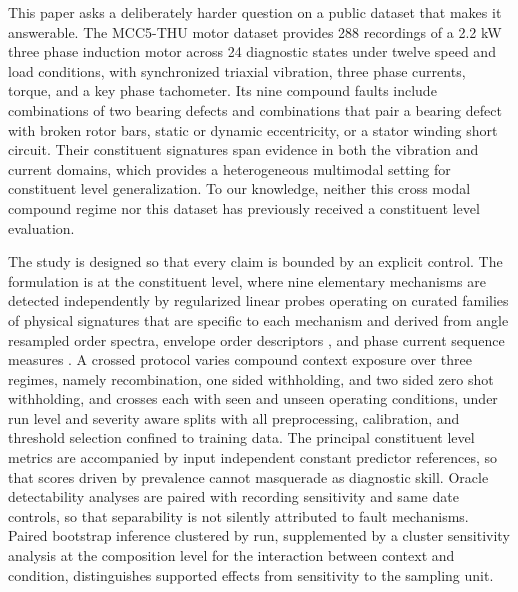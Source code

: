 \documentclass{ieeeaccess}
\begin{document}
This paper asks a deliberately harder question on a public dataset that makes
it answerable. The MCC5-THU motor dataset \cite{chen2026} provides 288
recordings of a 2.2 kW three phase induction motor across 24 diagnostic
states under twelve speed and load conditions, with synchronized triaxial
vibration, three phase currents, torque, and a key phase tachometer. Its nine
compound faults include combinations of two bearing defects and combinations
that pair a bearing defect with broken rotor bars, static or dynamic
eccentricity, or a stator winding short circuit. Their constituent signatures
span evidence in both the vibration and current domains, which provides a
heterogeneous multimodal setting for constituent level generalization. To our
knowledge, neither this cross modal compound regime nor this dataset has
previously received a constituent level evaluation.

The study is designed so that every claim is bounded by an explicit control.
The formulation is at the constituent level, where nine elementary mechanisms
are detected independently by regularized linear probes operating on curated
families of physical signatures that are specific to each mechanism and
derived from angle resampled order spectra, envelope order descriptors
\cite{randall2011tutorial}, and phase current sequence measures
\cite{thomson2001mcsa}. A crossed protocol varies compound context
exposure over three regimes, namely recombination, one sided withholding, and
two sided zero shot withholding, and crosses each with seen and unseen
operating conditions, under run level and severity aware splits with all
preprocessing, calibration, and threshold selection confined to training
data. The principal constituent level metrics are accompanied by input
independent constant predictor references, so that scores driven by
prevalence cannot masquerade as diagnostic skill. Oracle detectability
analyses are paired with recording sensitivity and same date controls, so
that separability is not silently attributed to fault mechanisms. Paired
bootstrap inference clustered by run, supplemented by a cluster sensitivity
analysis at the composition level for the interaction between context and
condition, distinguishes supported effects from sensitivity to the sampling
unit.
\end{document}
